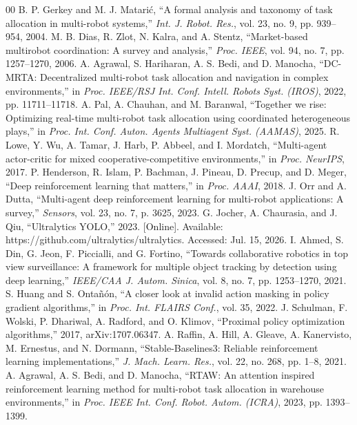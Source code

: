\documentclass[conference]{IEEEtran}
\begin{document}
\begin{thebibliography}{00}
 B. P. Gerkey and M. J. Matarić, ``A formal analysis and taxonomy of task allocation in multi-robot systems,'' \textit{Int. J. Robot. Res.}, vol. 23, no. 9, pp. 939--954, 2004.
 M. B. Dias, R. Zlot, N. Kalra, and A. Stentz, ``Market-based multirobot coordination: A survey and analysis,'' \textit{Proc. IEEE}, vol. 94, no. 7, pp. 1257--1270, 2006.
 A. Agrawal, S. Hariharan, A. S. Bedi, and D. Manocha, ``DC-MRTA: Decentralized multi-robot task allocation and navigation in complex environments,'' in \textit{Proc. IEEE/RSJ Int. Conf. Intell. Robots Syst. (IROS)}, 2022, pp. 11711--11718.
 A. Pal, A. Chauhan, and M. Baranwal, ``Together we rise: Optimizing real-time multi-robot task allocation using coordinated heterogeneous plays,'' in \textit{Proc. Int. Conf. Auton. Agents Multiagent Syst. (AAMAS)}, 2025.
 R. Lowe, Y. Wu, A. Tamar, J. Harb, P. Abbeel, and I. Mordatch, ``Multi-agent actor-critic for mixed cooperative-competitive environments,'' in \textit{Proc. NeurIPS}, 2017.
 P. Henderson, R. Islam, P. Bachman, J. Pineau, D. Precup, and D. Meger, ``Deep reinforcement learning that matters,'' in \textit{Proc. AAAI}, 2018.
 J. Orr and A. Dutta, ``Multi-agent deep reinforcement learning for multi-robot applications: A survey,'' \textit{Sensors}, vol. 23, no. 7, p. 3625, 2023.
 G. Jocher, A. Chaurasia, and J. Qiu, ``Ultralytics YOLO,'' 2023. [Online]. Available: https://github.com/ultralytics/ultralytics. Accessed: Jul. 15, 2026.
 I. Ahmed, S. Din, G. Jeon, F. Piccialli, and G. Fortino, ``Towards collaborative robotics in top view surveillance: A framework for multiple object tracking by detection using deep learning,'' \textit{IEEE/CAA J. Autom. Sinica}, vol. 8, no. 7, pp. 1253--1270, 2021.
 S. Huang and S. Ontañón, ``A closer look at invalid action masking in policy gradient algorithms,'' in \textit{Proc. Int. FLAIRS Conf.}, vol. 35, 2022.
 J. Schulman, F. Wolski, P. Dhariwal, A. Radford, and O. Klimov, ``Proximal policy optimization algorithms,'' 2017, arXiv:1707.06347.
 A. Raffin, A. Hill, A. Gleave, A. Kanervisto, M. Ernestus, and N. Dormann, ``Stable-Baselines3: Reliable reinforcement learning implementations,'' \textit{J. Mach. Learn. Res.}, vol. 22, no. 268, pp. 1--8, 2021.
 A. Agrawal, A. S. Bedi, and D. Manocha, ``RTAW: An attention inspired reinforcement learning method for multi-robot task allocation in warehouse environments,'' in \textit{Proc. IEEE Int. Conf. Robot. Autom. (ICRA)}, 2023, pp. 1393--1399.

\end{thebibliography}
\end{document}
